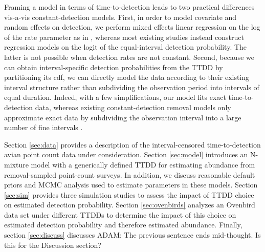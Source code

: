 \documentclass[useAMS,usenatbib,referee,12pt]{article}
\newcommand{\adam}[1]{{\color{blue} ADAM: #1}}
\begin{document}



Framing a model in terms of time-to-detection leads to two practical differences vis-a-vis constant-detection models.  
First, in order to model covariate and random effects on detection, we perform mixed effects linear regression on the log of the rate parameter as in \citet{Solymos2013}, whereas most existing studies instead construct regression models on the logit of the equal-interval detection probability.  
The latter is not possible when detection rates are not constant.  
Second, because we can obtain interval-specific detection probabilities from the TTDD by partitioning its cdf, we can directly model the data according to their existing interval structure rather than subdividing the observation period into intervals of equal duration.  
Indeed, with a few simplifications, our model fits exact time-to-detection data, whereas existing constant-detection removal models only approximate exact data by subdividing the observation interval into a large number of fine intervals \citep{Reidy2011, Amundson2014}.
% 

Section \ref{sec:data} provides a description of the interval-censored time-to-detection avian point count data under consideration.
Section \ref{sec:model} introduces an N-mixture model with a generically defined TTDD for estimating abundance from removal-sampled point-count surveys.
In addition, we discuss reasonable default priors and MCMC analysis used to estimate parameters in these models.
Section \ref{sec:sim} provides three simulation studies to assess the impact of TTDD choice on estimated detection probability. 
Section \ref{sec:ovenbirds} analyzes an Ovenbird data set under different TTDDs to determine the impact of this choice on estimated detection probability and therefore estimated abundance.
Finally, section \ref{sec:discuss} discusses 
\adam{The previous sentence ends mid-thought.  Is this for the Discussion section?}
\end{document}
